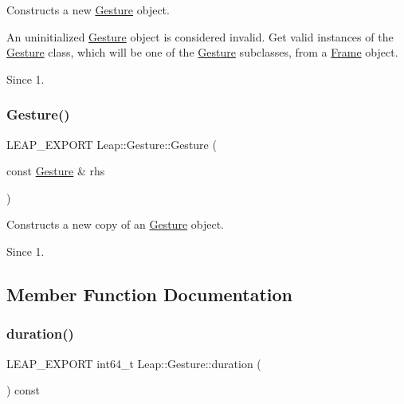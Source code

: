 Constructs a new \hyperlink{class_leap_1_1_gesture}{Gesture} object.

An uninitialized \hyperlink{class_leap_1_1_gesture}{Gesture} object is considered invalid. Get valid instances of the \hyperlink{class_leap_1_1_gesture}{Gesture} class, which will be one of the \hyperlink{class_leap_1_1_gesture}{Gesture} subclasses, from a \hyperlink{class_leap_1_1_frame}{Frame} object. \begin{DoxySince}{Since}
1. 
\end{DoxySince}
\mbox{\label{class_leap_1_1_gesture_a958edec008098eabcd1dc93208136c5f}} 
\subsubsection{\texorpdfstring{Gesture()}{Gesture()}\hspace{0.1cm}{\footnotesize\ttfamily [2/2]}}
{\footnotesize\ttfamily L\+E\+A\+P\+\_\+\+E\+X\+P\+O\+RT Leap\+::\+Gesture\+::\+Gesture (\begin{DoxyParamCaption}\item[{const \hyperlink{class_leap_1_1_gesture}{Gesture} \&}]{rhs }\end{DoxyParamCaption})}

Constructs a new copy of an \hyperlink{class_leap_1_1_gesture}{Gesture} object.


\begin{DoxyCodeInclude}
\end{DoxyCodeInclude}


\begin{DoxySince}{Since}
1. 
\end{DoxySince}


\subsection{Member Function Documentation}
\mbox{\label{class_leap_1_1_gesture_a5f2342e2fca1949880a042a76f147cec}} 
\subsubsection{\texorpdfstring{duration()}{duration()}}
{\footnotesize\ttfamily L\+E\+A\+P\+\_\+\+E\+X\+P\+O\+RT int64\+\_\+t Leap\+::\+Gesture\+::duration (\begin{DoxyParamCaption}{ }\end{DoxyParamCaption}) const}


